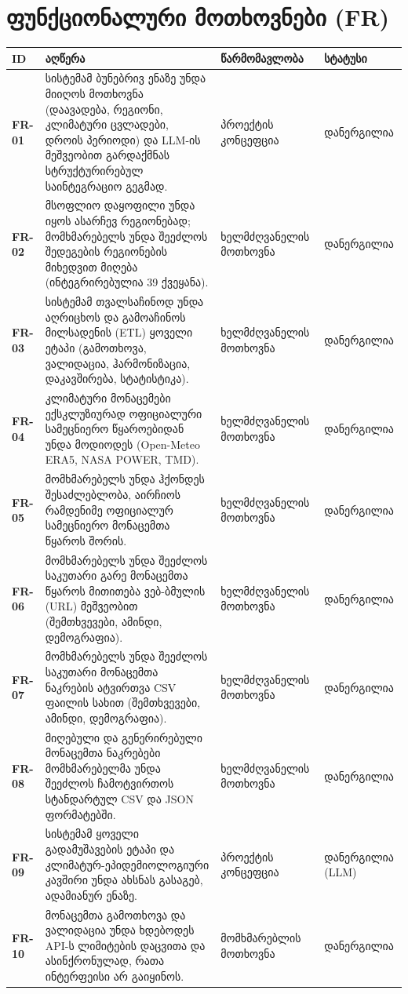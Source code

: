 \documentclass[11pt,a4paper]{article}
\begin{document}
\section{ფუნქციონალური მოთხოვნები (FR)}

\begin{longtable}{@{}>{\bfseries}p{1.6cm} L{7.4cm} L{3.6cm} L{2.4cm}@{}}
\toprule
ID & აღწერა & წარმომავლობა & სტატუსი \\
\midrule
\endhead
FR-01 & სისტემამ ბუნებრივ ენაზე უნდა მიიღოს მოთხოვნა (დაავადება, რეგიონი, კლიმატური ცვლადები, დროის პერიოდი) და LLM-ის მეშვეობით გარდაქმნას სტრუქტურირებულ საინტეგრაციო გეგმად. & პროექტის კონცეფცია & დანერგილია \\
FR-02 & მსოფლიო დაყოფილი უნდა იყოს ასარჩევ რეგიონებად; მომხმარებელს უნდა შეეძლოს შედეგების რეგიონების მიხედვით მიღება (ინტეგრირებულია 39 ქვეყანა). & ხელმძღვანელის მოთხოვნა & დანერგილია \\
FR-03 & სისტემამ თვალსაჩინოდ უნდა აღრიცხოს და გამოაჩინოს მილსადენის (ETL) ყოველი ეტაპი (გამოთხოვა, ვალიდაცია, ჰარმონიზაცია, დაკავშირება, სტატისტიკა). & ხელმძღვანელის მოთხოვნა & დანერგილია \\
FR-04 & კლიმატური მონაცემები ექსკლუზიურად ოფიციალური სამეცნიერო წყაროებიდან უნდა მოდიოდეს (Open-Meteo ERA5, NASA POWER, TMD). & ხელმძღვანელის მოთხოვნა & დანერგილია \\
FR-05 & მომხმარებელს უნდა ჰქონდეს შესაძლებლობა, აირჩიოს რამდენიმე ოფიციალურ სამეცნიერო მონაცემთა წყაროს შორის. & ხელმძღვანელის მოთხოვნა & დანერგილია \\
FR-06 & მომხმარებელს უნდა შეეძლოს საკუთარი გარე მონაცემთა წყაროს მითითება ვებ-ბმულის (URL) მეშვეობით (შემთხვევები, ამინდი, დემოგრაფია). & ხელმძღვანელის მოთხოვნა & დანერგილია \\
FR-07 & მომხმარებელს უნდა შეეძლოს საკუთარი მონაცემთა ნაკრების ატვირთვა CSV ფაილის სახით (შემთხვევები, ამინდი, დემოგრაფია). & ხელმძღვანელის მოთხოვნა & დანერგილია \\
FR-08 & მიღებული და გენერირებული მონაცემთა ნაკრებები მომხმარებელმა უნდა შეეძლოს ჩამოტვირთოს სტანდარტულ CSV და JSON ფორმატებში. & ხელმძღვანელის მოთხოვნა & დანერგილია \\
FR-09 & სისტემამ ყოველი გადამუშავების ეტაპი და კლიმატურ-ეპიდემიოლოგიური კავშირი უნდა ახსნას გასაგებ, ადამიანურ ენაზე. & პროექტის კონცეფცია & დანერგილია (LLM) \\
FR-10 & მონაცემთა გამოთხოვა და ვალიდაცია უნდა ხდებოდეს API-ს ლიმიტების დაცვითა და ასინქრონულად, რათა ინტერფეისი არ გაიყინოს. & მომხმარებლის მოთხოვნა & დანერგილია \\

\end{longtable}
\end{document}
